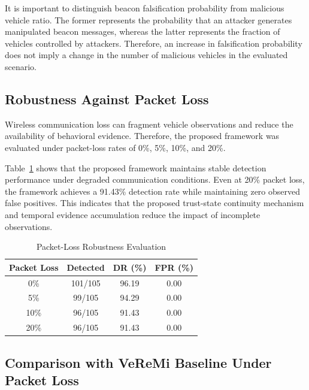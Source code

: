 \documentclass[journal]{IEEEtran}
\begin{document}
It is important to distinguish beacon falsification probability from
malicious vehicle ratio. The former represents the probability that an
attacker generates manipulated beacon messages, whereas the latter
represents the fraction of vehicles controlled by attackers. Therefore,
an increase in falsification probability does not imply a change in the
number of malicious vehicles in the evaluated scenario.

\subsection{Robustness Against Packet Loss}
\label{subsec:packet_loss}

Wireless communication loss can fragment vehicle observations and reduce the
availability of behavioral evidence. Therefore, the proposed framework was
evaluated under packet-loss rates of 0\%, 5\%, 10\%, and 20\%.

Table~\ref{tab:packet_loss} shows that the proposed framework maintains
stable detection performance under degraded communication conditions. Even at
20\% packet loss, the framework achieves a 91.43\% detection rate while
maintaining zero observed false positives. This indicates that the proposed
trust-state continuity mechanism and temporal evidence accumulation reduce
the impact of incomplete observations.

\begin{table}[!t]
\caption{Packet-Loss Robustness Evaluation}
\label{tab:packet_loss}
\centering
\renewcommand{\arraystretch}{1.15}
\begin{tabular}{cccc}
\toprule
\textbf{Packet Loss} & \textbf{Detected} & \textbf{DR (\%)} & \textbf{FPR (\%)} \\
\midrule
0\%  & 101/105 & 96.19 & 0.00 \\
5\%  & 99/105  & 94.29 & 0.00 \\
10\% & 96/105  & 91.43 & 0.00 \\
20\% & 96/105  & 91.43 & 0.00 \\
\bottomrule
\end{tabular}
\end{table}

\subsection{Comparison with VeReMi Baseline Under Packet Loss}
\label{subsec:baseline}
\end{document}
